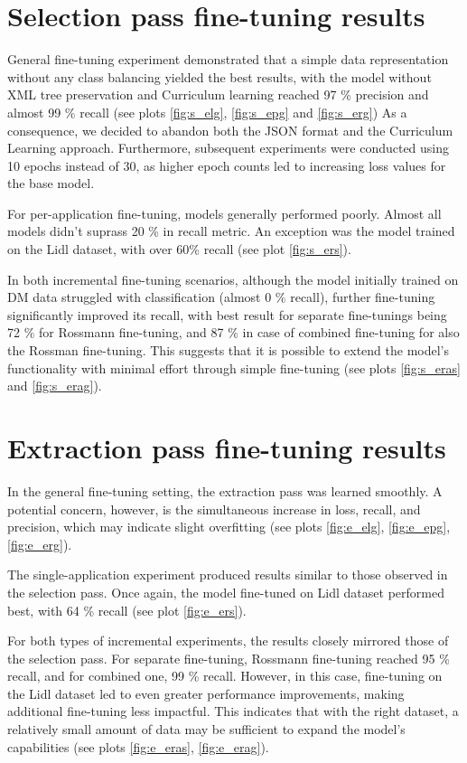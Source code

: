 \documentclass[licencjacka,en]{pracamgr}
\begin{document}
\section{Selection pass fine-tuning results}
General fine-tuning experiment demonstrated that a simple data representation without any class balancing yielded the best results, with the model without XML tree preservation and Curriculum learning reached 97 \% precision and almost 99 \% recall (see plots \ref{fig:s_elg}, \ref{fig:s_epg} and \ref{fig:s_erg}) As a consequence, we decided to abandon both the JSON format and the Curriculum Learning approach. Furthermore, subsequent experiments were conducted using 10 epochs instead of 30, as higher epoch counts led to increasing loss values for the base model.

For per-application fine-tuning, models generally performed poorly. Almost all models didn't suprass 20 \% in recall metric. An exception was the model trained on the Lidl dataset, with over 60\% recall (see plot \ref{fig:s_ers}).

In both incremental fine-tuning scenarios, although the model initially trained on DM data struggled with classification (almost 0 \% recall), further fine-tuning significantly improved its recall, with best result for separate fine-tunings being 72 \%  for Rossmann fine-tuning, and 87 \% in case of combined fine-tuning for also the Rossman fine-tuning. This suggests that it is possible to extend the model's functionality with minimal effort through simple fine-tuning (see plots \ref{fig:s_eras} and \ref{fig:s_erag}).

\section{Extraction pass fine-tuning results}
In the general fine-tuning setting, the extraction pass was learned smoothly. A potential concern, however, is the simultaneous increase in loss, recall, and precision, which may indicate slight overfitting (see plots \ref{fig:e_elg}, \ref{fig:e_epg}, \ref{fig:e_erg}).

The single-application experiment produced results similar to those observed in the selection pass. Once again, the model fine-tuned on Lidl dataset performed best, with 64 \% recall (see plot \ref{fig:e_ers}).

For both types of incremental experiments, the results closely mirrored those of the selection pass. For separate fine-tuning, Rossmann fine-tuning reached 95 \% recall, and for combined one, 99 \% recall. However, in this case, fine-tuning on the Lidl dataset led to even greater performance improvements, making additional fine-tuning less impactful. This indicates that with the right dataset, a relatively small amount of data may be sufficient to expand the model’s capabilities (see plots \ref{fig:e_eras}, \ref{fig:e_erag}).
\end{document}
